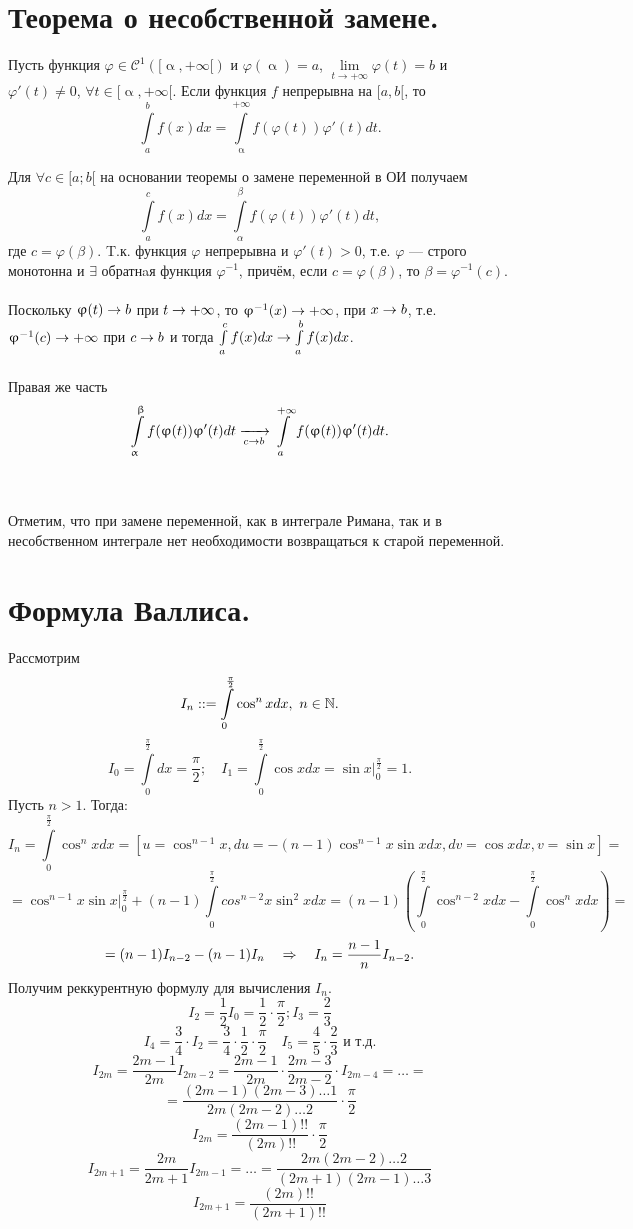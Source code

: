 \section{Теорема о несобственной замене.}
\begin{theorem}
	Пусть функция $\varphi \in \mathcal{C}^1([\upalpha, +\infty[)$ и $\varphi(\upalpha)=a$, $\lim\limits_{t\to +\infty}\varphi(t)=b$ и $\varphi'(t)\neq 0$, $\forall t \in [\upalpha, +\infty[$.
	Если функция $f$ непрерывна на $[a,b[$, то $$\int\limits_a^b f(x)dx = \int\limits_{\upalpha}^{+\infty}f(\varphi(t))\varphi'(t)dt.$$
\end{theorem}
\begin{Proof}
	Для $\forall c \in [a;b[$ на основании теоремы о замене переменной в ОИ получаем
	$$\int\limits_a^c f(x)dx = \int\limits_\alpha^\beta f(\varphi(t))\varphi'(t)dt,$$ где $c = \varphi(\beta)$.
	T.к. функция $\varphi$ непрерывна и $\varphi'(t)>0$, т.е. $\varphi$ --- строго монотонна и $\exists$ обратнaя функция $\varphi^{-1}$, причём, если $c = \varphi(\beta)$, то $\beta = \varphi^{-1}(c)$.\\\\
	Поскольку $\upvarphi(t)\rightarrow b$ при $t\rightarrow+\infty$, то $\upvarphi^{-1}(x)\rightarrow+\infty$, при $x\rightarrow b$, т.е. $\upvarphi^{-1}(c)\rightarrow+\infty$ при $c\rightarrow b$ и тогда $\int\limits_a^c f(x)dx \rightarrow \int\limits_a^b f(x)dx$.\\\\
	Правая же часть $$\int\limits_\upalpha^\upbeta f(\upvarphi(t))\upvarphi'(t)dt \xrightarrow[c\rightarrow b]{} \int\limits_a^{+\infty} f(\upvarphi(t))\upvarphi'(t)dt.$$
\end{Proof}\\\\
Отметим, что при замене переменной, как в интеграле Римана, так и в несобственном интеграле нет необходимости возвращаться к старой переменной.
\section{Формула Валлиса.}
Рассмотрим $$I_n::=\int\limits_0^{\frac{\pi}{2}}\cos^n x dx,\ n \in \N.$$ $$I_0=\int\limits_0^{\frac{\pi}{2}}dx=\frac{\pi}{2};\quad  I_1 = \int\limits_0^{\frac{\pi}{2}}\cos xdx = \sin x|_0^{\frac{\pi}{2}} = 1.$$
Пусть $n>1$. Тогда:
$$I_n = \int\limits_0^{\frac{\pi}{2}}\cos^n xdx = [u = \cos^{n-1}x, du = -(n-1)\cos^{n-1}x\sin xdx, dv = \cos xdx, v = \sin x] =$$ $$= \cos^{n-1}x\sin x|_0^{\frac{\pi}{2}} + (n-1)\int\limits_0^{\frac{\pi}{2}}cos^{n-2}x\sin^2 xdx = (n-1)(\int\limits_0^{\frac{\pi}{2}}\cos^{n-2}xdx - \int\limits_0^{\frac{\pi}{2}}\cos^n xdx) =$$ $$=(n-1)I_{n-2}-(n-1)I_n\quad\Rightarrow\quad I_n = \frac{n-1}{n}I_{n-2}.$$
Получим реккурентную формулу для вычисления $I_n$.
$$I_2 = \frac{1}{2}I_0=\frac{1}{2}\cdot\frac{\pi}{2}; I_3=\frac{2}{3}$$
$$I_4=\frac{3}{4}\cdot I_2=\frac{3}{4}\cdot\frac{1}{2}\cdot\frac{\pi}{2}\quad I_5=\frac{4}{5}\cdot\frac{2}{3} \text{ и т.д.}$$
$$I_{2m}=\frac{2m-1}{2m}I_{2m-2} = \frac{2m-1}{2m}\cdot\frac{2m-3}{2m-2}\cdot I_{2m-4} = \ldots = $$
$$= \frac{(2m-1)(2m-3)\ldots 1}{2m(2m-2)\ldots 2}\cdot \frac{\pi}{2}$$
$$I_{2m} = \frac{(2m-1)!!}{(2m)!!}\cdot\frac{\pi}{2}$$
$$I_{2m+1} = \frac{2m}{2m+1}I_{2m-1}=\ldots=\frac{2m(2m-2)\ldots 2}{(2m+1)(2m-1)\ldots 3}$$
$$I_{2m+1}=\frac{(2m)!!}{(2m+1)!!}$$

